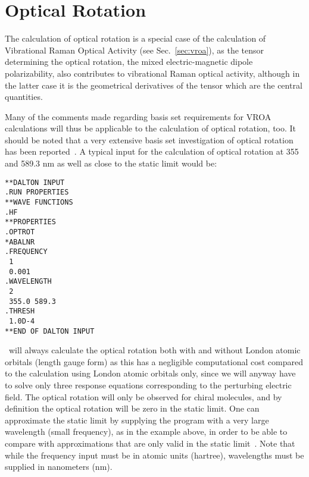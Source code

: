 \section{Optical Rotation}\label{sec:optrot}

\begin{center}
\end{center}

The calculation of optical rotation is a special case of the
calculation of Vibrational Raman Optical Activity (see
Sec.~\ref{sec:vroa}), as the tensor determining the optical rotation,
the mixed electric-magnetic dipole polarizability, also contributes to
vibrational Raman optical activity, although in the latter case it is the
geometrical derivatives of the tensor which are the central quantities.

Many of the comments made regarding basis set requirements for VROA
calculations will thus be applicable to the calculation of
optical rotation, too. It should be noted that a very extensive basis set
investigation of optical rotation has been
reported~\cite{jrcmjffjdpjsjpca104}.
A typical input for the calculation of optical rotation at
355 and 589.3 nm as well as close to the static limit would
be:

\begin{verbatim}
**DALTON INPUT
.RUN PROPERTIES
**WAVE FUNCTIONS
.HF
**PROPERTIES
.OPTROT
*ABALNR
.FREQUENCY
 1
 0.001
.WAVELENGTH
 2
 355.0 589.3
.THRESH
 1.0D-4
**END OF DALTON INPUT
\end{verbatim}

\dalton\ will always calculate the optical rotation both with and
without London atomic orbitals (length gauge form)
as this has a negligible computational
cost compared to the calculation using London atomic orbitals only,
since we will anyway have to solve only three response equations
corresponding to the perturbing electric field. The optical rotation
will only be observed for chiral molecules, 
and by definition the optical
rotation will be zero in the static limit. One can approximate the
static limit by supplying the program with a very large wavelength
(small frequency), as in the example above, in order to be able to
compare with approximations that are only valid in the static
limit~\cite{rdacpl87,jrcmjffjdpjsjpca104}. Note that while the
frequency input must be in atomic units (hartree),
wavelengths must be supplied in nanometers (nm).

